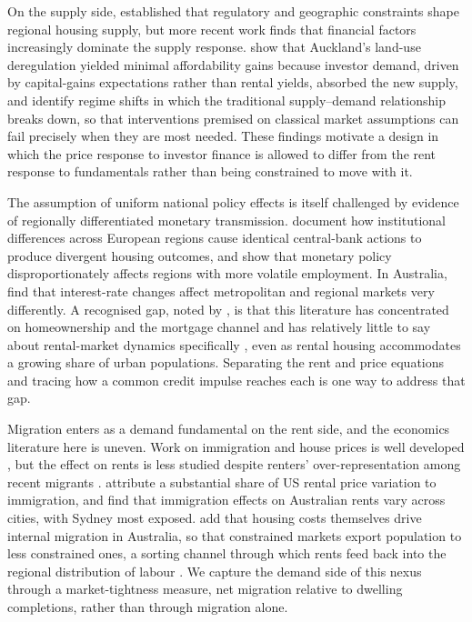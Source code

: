 \documentclass[preprint,11pt,authoryear]{elsarticle}
\begin{document}
On the supply side, \citet{glaeser2003impact} established that regulatory
and geographic constraints shape regional housing supply, but more recent
work finds that financial factors increasingly dominate the supply
response. \citet{greenaway2023impact} show that Auckland's land-use
deregulation yielded minimal affordability gains because investor demand,
driven by capital-gains expectations rather than rental yields, absorbed
the new supply, and \citet{egan2023regime} identify regime shifts in which
the traditional supply--demand relationship breaks down, so that
interventions premised on classical market assumptions can fail precisely
when they are most needed. These findings motivate a design in which the
price response to investor finance is allowed to differ from the rent
response to fundamentals rather than being constrained to move with it.

The assumption of uniform national policy effects is itself challenged by
evidence of regionally differentiated monetary transmission.
\citet{koeniger2022transmission} document how institutional differences
across European regions cause identical central-bank actions to produce
divergent housing outcomes, and \citet{calza2013housing} show that
monetary policy disproportionately affects regions with more volatile
employment. In Australia, \citet{graham2023house} find that interest-rate
changes affect metropolitan and regional markets very differently. A
recognised gap, noted by \citet{stephens2024role}, is that this literature
has concentrated on homeownership and the mortgage channel and has
relatively little to say about rental-market dynamics specifically
\citep{KUANG2026105191}, even as rental housing accommodates a growing
share of urban populations. Separating the rent and price equations and
tracing how a common credit impulse reaches each is one way to address
that gap.

Migration enters as a demand fundamental on the rent side, and the
economics literature here is uneven. Work on immigration and house prices
is well developed \citep{saiz2010geographic, sanchis2023decomposing}, but
the effect on rents is less studied despite renters' over-representation
among recent migrants \citep{nygaard2011international}.
\citet{sharpe2019reevaluating} attribute a substantial share of US rental
price variation to immigration, and \citet{moallemi2020impact} find that
immigration effects on Australian rents vary across cities, with Sydney
most exposed. \citet{li2024internal} add that housing costs themselves
drive internal migration in Australia, so that constrained markets export
population to less constrained ones, a sorting channel through which rents
feed back into the regional distribution of labour
\citep{haas2014commuting}. We capture the demand side of this nexus
through a market-tightness measure, net migration relative to dwelling
completions, rather than through migration alone.
\end{document}
